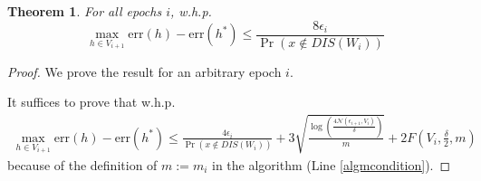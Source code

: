\documentclass{article}[12pt]
\newtheorem{thm}{Theorem}%
\theoremstyle{named}
\DeclareMathOperator{\Prtxt}{Pr}
\newcommand{\prp}[2]{\Prtxt_{#2} \left(#1\right)}
\newcommand{\err}[1]{\mbox{err}\left(#1\right)}
\newcommand{\cN}{\mathcal{N}}
\newcommand{\lrp}[1]{\left(#1\right)}
\begin{document}
\begin{thm}
\label{thm:fallback}
For all epochs $i$, w.h.p.
$$ \max_{h \in V_{i+1}} \err{h} - \err{h^*} \leq \frac{8 \epsilon_i}{\prp{x \notin DIS(W_i)}{}} $$
\end{thm}
\begin{proof}
We prove the result for an arbitrary epoch $i$. 

It suffices to prove that w.h.p.
\begin{align}
\label{fallbackinfull}
\max_{h \in V_{i+1}} \err{h} - \err{h^*} \leq \frac{4 \epsilon_i}{\prp{x \notin DIS(W_i)}{}} 
+ 3 \sqrt{\frac{ \log \lrp{\frac{ 4 \cN (\epsilon_{i+1}, V_i) }{\delta}} }{ m }} 
+ 2 F \lrp{ V_i, \frac{\delta}{2}, m }
\end{align}
because of the definition of $m := m_i$ in the algorithm (Line \ref{algmcondition}).


\end{proof}
\end{document}
